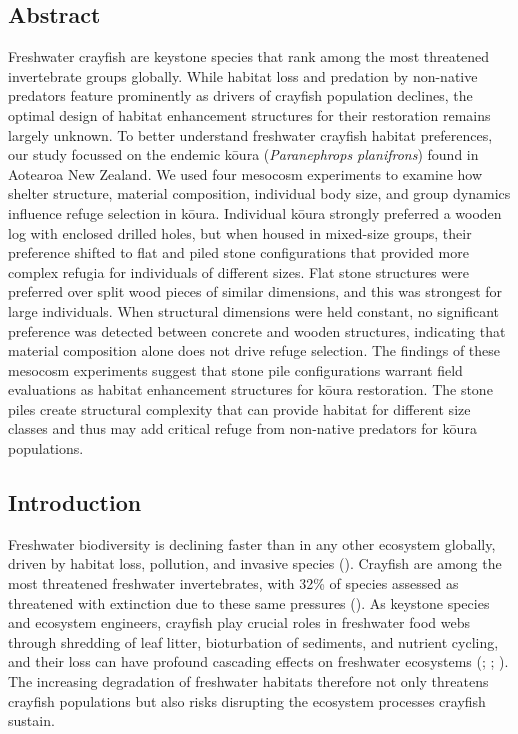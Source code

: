 \documentclass[
  letterpaper,
  DIV=11,
  numbers=noendperiod]{scrartcl}
\begin{document}
\subsection*{Abstract}\label{abstract}

Freshwater crayfish are keystone species that rank among the most
threatened invertebrate groups globally. While habitat loss and
predation by non-native predators feature prominently as drivers of
crayfish population declines, the optimal design of habitat enhancement
structures for their restoration remains largely unknown. To better
understand freshwater crayfish habitat preferences, our study focussed
on the endemic kōura (\emph{Paranephrops planifrons}) found in Aotearoa
New Zealand. We used four mesocosm experiments to examine how shelter
structure, material composition, individual body size, and group
dynamics influence refuge selection in kōura. Individual kōura strongly
preferred a wooden log with enclosed drilled holes, but when housed in
mixed-size groups, their preference shifted to flat and piled stone
configurations that provided more complex refugia for individuals of
different sizes. Flat stone structures were preferred over split wood
pieces of similar dimensions, and this was strongest for large
individuals. When structural dimensions were held constant, no
significant preference was detected between concrete and wooden
structures, indicating that material composition alone does not drive
refuge selection. The findings of these mesocosm experiments suggest
that stone pile configurations warrant field evaluations as habitat
enhancement structures for kōura restoration. The stone piles create
structural complexity that can provide habitat for different size
classes and thus may add critical refuge from non-native predators for
kōura populations.

\subsection{Introduction}\label{introduction}

Freshwater biodiversity is declining faster than in any other ecosystem
globally, driven by habitat loss, pollution, and invasive species
(). Crayfish are
among the most threatened freshwater invertebrates, with 32\% of species
assessed as threatened with extinction due to these same pressures
(). As keystone
species and ecosystem engineers, crayfish play crucial roles in
freshwater food webs through shredding of leaf litter, bioturbation of
sediments, and nutrient cycling, and their loss can have profound
cascading effects on freshwater ecosystems
(;
;
). The increasing
degradation of freshwater habitats therefore not only threatens crayfish
populations but also risks disrupting the ecosystem processes crayfish
sustain.
\end{document}
